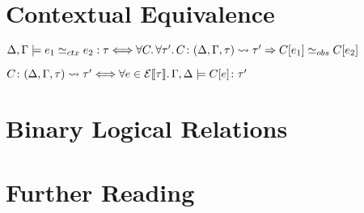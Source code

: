 \section{Contextual Equivalence}

$\Delta, \Gamma \models e_1 \simeq_{ctx} e_2 : \tau \Longleftrightarrow
  \forall C \ldotp \forall \tau' \ldotp C \colon (\Delta, \Gamma, \tau) \leadsto \tau' \Rightarrow C[e_1] \simeq_{obs} C[e_2]$

$C \colon (\Delta, \Gamma, \tau) \leadsto \tau' \Longleftrightarrow
  \forall e \in \mathcal{E}\llbracket\tau\rrbracket \ldotp \Gamma,\Delta\models C[e] \colon \tau'$

\section{Binary Logical Relations}

\section{Further Reading}
